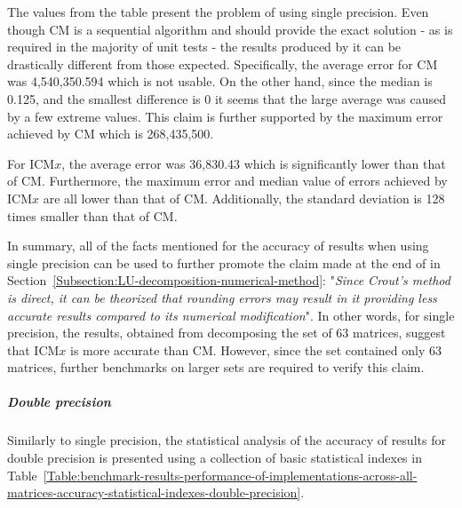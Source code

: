 The values from the table present the problem of using single precision. Even though CM is a sequential algorithm and should provide the exact solution - as is required in the majority of unit tests - the results produced by it can be drastically different from those expected. Specifically, the average error for CM was 4,540,350.594 which is not usable. On the other hand, since the median is 0.125, and the smallest difference is 0 it seems that the large average was caused by a few extreme values. This claim is further supported by the maximum error achieved by CM which is 268,435,500.
\par For ICM$ x $, the average error was 36,830.43 which is significantly lower than that of CM. Furthermore, the maximum error and median value of errors achieved by ICM$ x $ are all lower than that of CM. Additionally, the standard deviation is 128 times smaller than that of CM.
\par In summary, all of the facts mentioned for the accuracy of results when using single precision can be used to further promote the claim made at the end of \textit{} in Section~\ref{Subsection:LU-decomposition-numerical-method}: "\textit{Since Crout's method is direct, it can be theorized that rounding errors may result in it providing less accurate results compared to its numerical modification}". In other words, for single precision, the results, obtained from decomposing the set of 63 matrices, suggest that ICM$ x $ is more accurate than CM. However, since the set contained only 63 matrices, further benchmarks on larger sets are required to verify this claim.

\subparagraph{Double precision} Similarly to single precision, the statistical analysis of the accuracy of results for double precision is presented using a collection of basic statistical indexes in Table~\ref{Table:benchmark-results-performance-of-implementations-across-all-matrices-accuracy-statistical-indexes-double-precision}.

